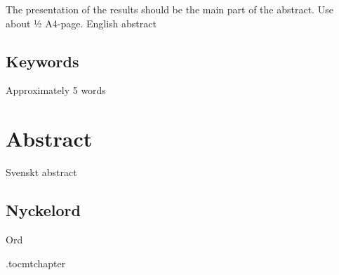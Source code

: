 The presentation of the results should be the main part of the abstract. Use about ½ A4-page.
English abstract

\subsection*{Keywords}
Approximately 5 words

\newpage
\section*{Abstract}
Svenskt abstract

\subsection*{Nyckelord}
Ord


\etocdepthtag.toc{mtchapter}
\newpage
\thispagestyle{fancy}
\tableofcontents
\thispagestyle{fancy} %
